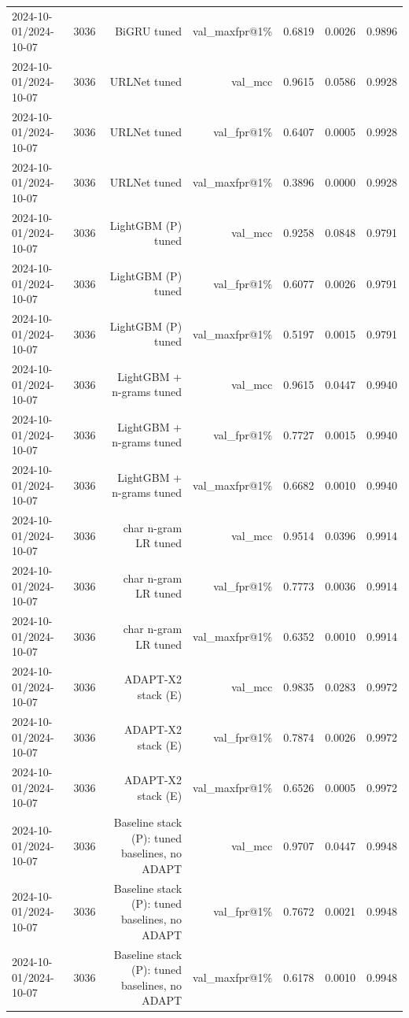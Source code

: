 \begin{table}[t]
\begin{tabular}{llrrrrr}
2024-10-01/2024-10-07 & 3036 & BiGRU tuned & val\_maxfpr@1\% & 0.6819 & 0.0026 & 0.9896 \\
2024-10-01/2024-10-07 & 3036 & URLNet tuned & val\_mcc & 0.9615 & 0.0586 & 0.9928 \\
2024-10-01/2024-10-07 & 3036 & URLNet tuned & val\_fpr@1\% & 0.6407 & 0.0005 & 0.9928 \\
2024-10-01/2024-10-07 & 3036 & URLNet tuned & val\_maxfpr@1\% & 0.3896 & 0.0000 & 0.9928 \\
2024-10-01/2024-10-07 & 3036 & LightGBM (P) tuned & val\_mcc & 0.9258 & 0.0848 & 0.9791 \\
2024-10-01/2024-10-07 & 3036 & LightGBM (P) tuned & val\_fpr@1\% & 0.6077 & 0.0026 & 0.9791 \\
2024-10-01/2024-10-07 & 3036 & LightGBM (P) tuned & val\_maxfpr@1\% & 0.5197 & 0.0015 & 0.9791 \\
2024-10-01/2024-10-07 & 3036 & LightGBM + n-grams tuned & val\_mcc & 0.9615 & 0.0447 & 0.9940 \\
2024-10-01/2024-10-07 & 3036 & LightGBM + n-grams tuned & val\_fpr@1\% & 0.7727 & 0.0015 & 0.9940 \\
2024-10-01/2024-10-07 & 3036 & LightGBM + n-grams tuned & val\_maxfpr@1\% & 0.6682 & 0.0010 & 0.9940 \\
2024-10-01/2024-10-07 & 3036 & char n-gram LR tuned & val\_mcc & 0.9514 & 0.0396 & 0.9914 \\
2024-10-01/2024-10-07 & 3036 & char n-gram LR tuned & val\_fpr@1\% & 0.7773 & 0.0036 & 0.9914 \\
2024-10-01/2024-10-07 & 3036 & char n-gram LR tuned & val\_maxfpr@1\% & 0.6352 & 0.0010 & 0.9914 \\
2024-10-01/2024-10-07 & 3036 & ADAPT-X2 stack (E) & val\_mcc & 0.9835 & 0.0283 & 0.9972 \\
2024-10-01/2024-10-07 & 3036 & ADAPT-X2 stack (E) & val\_fpr@1\% & 0.7874 & 0.0026 & 0.9972 \\
2024-10-01/2024-10-07 & 3036 & ADAPT-X2 stack (E) & val\_maxfpr@1\% & 0.6526 & 0.0005 & 0.9972 \\
2024-10-01/2024-10-07 & 3036 & Baseline stack (P): tuned baselines, no ADAPT & val\_mcc & 0.9707 & 0.0447 & 0.9948 \\
2024-10-01/2024-10-07 & 3036 & Baseline stack (P): tuned baselines, no ADAPT & val\_fpr@1\% & 0.7672 & 0.0021 & 0.9948 \\
2024-10-01/2024-10-07 & 3036 & Baseline stack (P): tuned baselines, no ADAPT & val\_maxfpr@1\% & 0.6178 & 0.0010 & 0.9948 \\

\end{tabular}
\end{table}
